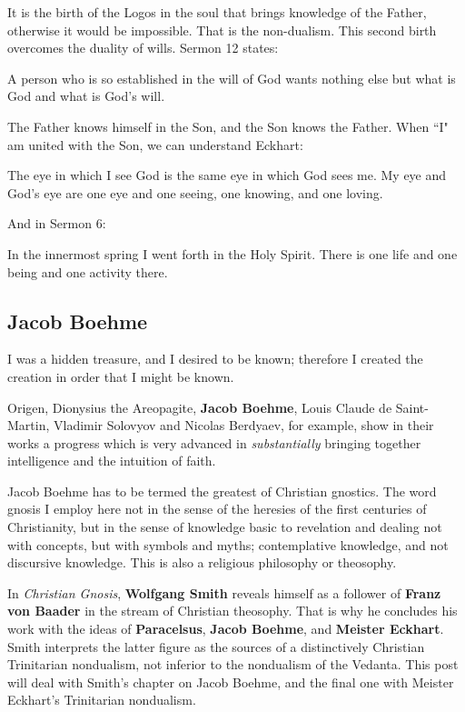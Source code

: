 It is the birth of the Logos in the soul that brings knowledge of the Father, otherwise it would be impossible. That is the non-dualism. This second birth overcomes the duality of wills. Sermon 12 states:

\begin{quotex}
A person who is so established in the will of God wants nothing else but what is God and what is God's will. 

\end{quotex}
The Father knows himself in the Son, and the Son knows the Father. When ``I" am united with the Son, we can understand Eckhart:

\begin{quotex}
The eye in which I see God is the same eye in which God sees me. My eye and God's eye are one eye and one seeing, one knowing, and one loving. 

\end{quotex}
And in Sermon 6:

\begin{quotex}
In the innermost spring I went forth in the Holy Spirit. There is one life and one being and one activity there. 

\end{quotex}

\subsection{Jacob Boehme}

\begin{quotex}
I was a hidden treasure, and I desired to be known; therefore I created the creation in order that I might be known. 

Origen, Dionysius the Areopagite, \textbf{Jacob Boehme}, Louis Claude de Saint-Martin, Vladimir Solovyov and Nicolas Berdyaev, for example, show in their works a progress which is very advanced in \emph{substantially }bringing together intelligence and the intuition of faith. 

Jacob Boehme has to be termed the greatest of Christian gnostics. The word gnosis I employ here not in the sense of the heresies of the first centuries of Christianity, but in the sense of knowledge basic to revelation and dealing not with concepts, but with symbols and myths; contemplative knowledge, and not discursive knowledge. This is also a religious philosophy or theosophy.

\end{quotex}
In \emph{Christian Gnosis}, \textbf{Wolfgang Smith} reveals himself as a follower of \textbf{Franz von Baader} in the stream of Christian theosophy. That is why he concludes his work with the ideas of \textbf{Paracelsus}, \textbf{Jacob Boehme}, and \textbf{Meister Eckhart}. Smith interprets the latter figure as the sources of a distinctively Christian Trinitarian nondualism, not inferior to the nondualism of the Vedanta. This post will deal with Smith's chapter on Jacob Boehme, and the final one with Meister Eckhart's Trinitarian nondualism.

